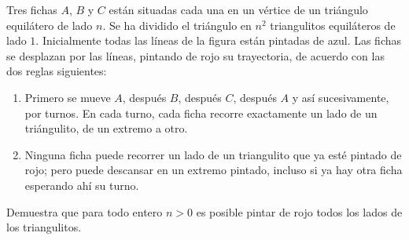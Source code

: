 Tres fichas $A$, $B$ y $C$ están situadas cada una en un vértice de un triángulo equilátero de lado $n$. Se ha dividido el triángulo en $n^2$ triangulitos equiláteros de lado $1$. \newline 
Inicialmente todas las líneas de la figura están pintadas de azul. Las fichas se desplazan por las líneas, pintando de rojo su trayectoria, de acuerdo con las dos reglas siguientes:
 \begin{enumerate} 
   \item  Primero se mueve $A$, después $B$, después $C$, después $A$ y así sucesivamente, por turnos. En cada turno, cada ficha recorre exactamente un lado de un triángulito, de un extremo a otro.
   \item  Ninguna ficha puede recorrer un lado de un triangulito que ya esté pintado de rojo; pero puede descansar en un extremo pintado, incluso si ya hay otra ficha esperando ahí su turno.
 \end{enumerate} 
Demuestra que para todo entero $n>0$ es posible pintar de rojo todos los lados de los triangulitos.
